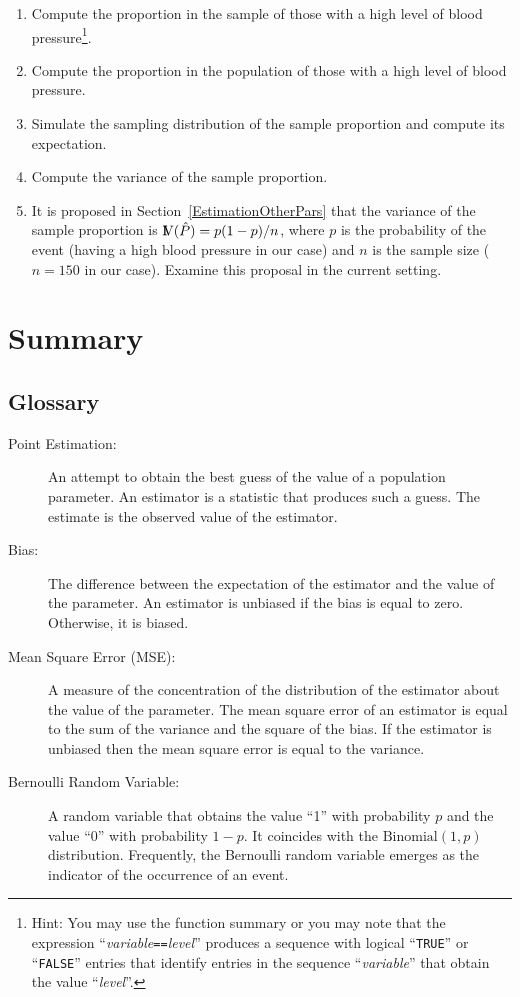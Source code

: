 \documentclass[]{krantz}
\newcommand{\Var}{{\rm I\kern-.3em V}}
\theoremstyle{definition}
\theoremstyle{definition}
\theoremstyle{definition}
\theoremstyle{remark}
\begin{document}
\begin{enumerate}
\def\labelenumi{\arabic{enumi}.}
\item
  Compute the proportion in the sample of those with a high level of
  blood pressure\footnote{Hint: You may use the function summary or you may note that the
    expression ``\emph{variable}\texttt{==}\emph{level}'' produces a sequence with logical
    ``\texttt{TRUE}'' or ``\texttt{FALSE}'' entries that identify entries in the sequence
    ``\emph{variable}'' that obtain the value ``\emph{level}''.}.
\item
  Compute the proportion in the population of those with a high level
  of blood pressure.
\item
  Simulate the sampling distribution of the sample proportion and
  compute its expectation.
\item
  Compute the variance of the sample proportion.
\item
  It is proposed in Section~\ref{EstimationOtherPars} that the variance
  of the sample proportion is \(\Var(\hat P) = p(1-p)/n\), where \(p\) is
  the probability of the event (having a high blood pressure in our
  case) and \(n\) is the sample size (\(n=150\) in our case). Examine this
  proposal in the current setting.
\end{enumerate}

\hypertarget{summary-8}{%
\section{Summary}\label{summary-8}}

\hypertarget{glossary}{%
\subsection*{Glossary}\label{glossary}}


\begin{description}
\item[Point Estimation:]
An attempt to obtain the best guess of the value of a population
parameter. An estimator is a statistic that produces such a guess.
The estimate is the observed value of the estimator.
\item[Bias:]
The difference between the expectation of the estimator and the
value of the parameter. An estimator is unbiased if the bias is
equal to zero. Otherwise, it is biased.
\item[Mean Square Error (MSE):]
A measure of the concentration of the distribution of the estimator
about the value of the parameter. The mean square error of an
estimator is equal to the sum of the variance and the square of the
bias. If the estimator is unbiased then the mean square error is
equal to the variance.
\item[Bernoulli Random Variable:]
A random variable that obtains the value ``1'' with probability \(p\)
and the value ``0'' with probability \(1-p\). It coincides with the
\(\mathrm{Binomial}(1,p)\) distribution. Frequently, the Bernoulli
random variable emerges as the indicator of the occurrence of an
event.
\end{description}
\end{document}
